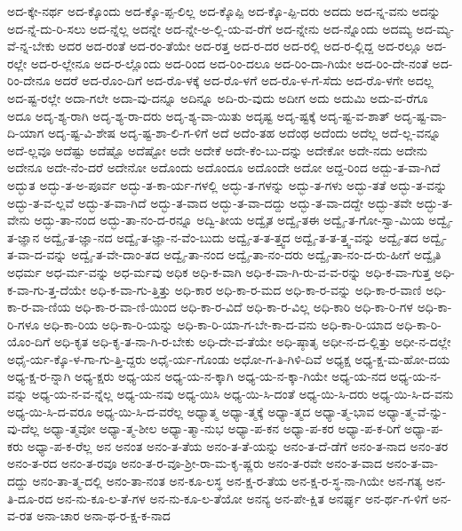 {ಅದ-ಕ್ಕೇ-ನರ್ಥ
ಅದ-ಕ್ಕೊಂದು
ಅದ-ಕ್ಕೊ-ಪ್ಪ-ಲಿಲ್ಲ
ಅದ-ಕ್ಕೊಪ್ಪಿ
ಅದ-ಕ್ಕೊ-ಪ್ಪಿ-ದರು
ಅದದು
ಅದ-ನ್ನ-ವನು
ಅದನ್ನು
ಅದ-ನ್ನೆ-ದು-ರಿ-ಸಲು
ಅದ-ನ್ನೆಲ್ಲ
ಅದನ್ನೇ
ಅದ-ನ್ನೇ-ಅ-ಲ್ಲಿ-ಯ-ವ-ರೆಗೆ
ಅದ-ನ್ನೇನು
ಅದ-ನ್ನೊಂದು
ಅದಮ್ಯ
ಅದ-ಮ್ಯ-ವೆ-ನ್ನ-ಬೇಕು
ಅದರ
ಅದ-ರಂತೆ
ಅದ-ರಂ-ತೆಯೇ
ಅದ-ರತ್ತ
ಅದ-ರ-ದರ
ಅದ-ರಲ್ಲಿ
ಅದ-ರ-ಲ್ಲಿದ್ದ
ಅದ-ರಲ್ಲೂ
ಅದ-ರಲ್ಲೇ
ಅದ-ರ-ಲ್ಲೇನೂ
ಅದ-ರ-ಲ್ಲೊಂದು
ಅದ-ರಿಂದ
ಅದ-ರಿಂ-ದಲೂ
ಅದ-ರಿಂ-ದಾ-ಗಿಯೇ
ಅದ-ರಿಂ-ದೇ-ನಂತೆ
ಅದ-ರಿಂ-ದೇನೂ
ಅದರೆ
ಅದ-ರೊಂ-ದಿಗೆ
ಅದ-ರೊ-ಳಕ್ಕೆ
ಅದ-ರೊ-ಳಗೆ
ಅದ-ರೊ-ಳ-ಗೆ-ಸೆದು
ಅದ-ರೊ-ಳಗೇ
ಅದಲ್ಲ
ಅದ-ಷ್ಟ-ರಲ್ಲೇ
ಅದಾ-ಗಲೇ
ಅದಾ-ವು-ದನ್ನೂ
ಅದಿನ್ನೂ
ಅದಿ-ರು-ವುದು
ಅದೀಗ
ಅದು
ಅದುಮಿ
ಅದು-ವ-ರೆಗೂ
ಅದೂ
ಅದೃ-ಶ್ಯ-ರಾಗಿ
ಅದೃ-ಶ್ಯ-ರಾ-ದರು
ಅದೃ-ಶ್ಯ-ವಾ-ಯಿತು
ಅದೃಷ್ಟ
ಅದೃ-ಷ್ಟಕ್ಕೆ
ಅದೃ-ಷ್ಟ-ವ-ಶಾತ್
ಅದೃ-ಷ್ಟ-ವಾ-ದಿ-ಯಾಗ
ಅದೃ-ಷ್ಟ-ವಿ-ಶೇಷ
ಅದೃ-ಷ್ಟ-ಶಾ-ಲಿ-ಗ-ಳಿಗೆ
ಅದೆ
ಅದೆಂ-ತಹ
ಅದೆಂಥ
ಅದೆಂದು
ಅದೆಲ್ಲ
ಅದೆ-ಲ್ಲ-ವನ್ನೂ
ಅದೆ-ಲ್ಲವೂ
ಅದೆಷ್ಟು
ಅದೆಷ್ಟೊ
ಅದೆಷ್ಟೋ
ಅದೇ
ಅದೇಕೆ
ಅದೇ-ಕೆಂ-ಬು-ದನ್ನು
ಅದೇಕೋ
ಅದೇ-ನದು
ಅದೇನು
ಅದೇನೂ
ಅದೇ-ನೆಂ-ದರೆ
ಅದೇನೋ
ಅದೊಂದು
ಅದೊಂದೂ
ಅದೊಂದೇ
ಅದೋ
ಅದ್ದ-ರಿಂದ
ಅದ್ಬು-ತ-ವಾ-ಗಿದೆ
ಅದ್ಭುತ
ಅದ್ಭು-ತ-ಅ-ಪೂರ್ವ
ಅದ್ಭು-ತ-ಕಾ-ರ್ಯ-ಗಳಲ್ಲಿ
ಅದ್ಭು-ತ-ಗಳನ್ನು
ಅದ್ಭು-ತ-ಗಳು
ಅದ್ಭು-ತತೆ
ಅದ್ಭು-ತ-ವನ್ನು
ಅದ್ಭು-ತ-ವ-ಲ್ಲವೆ
ಅದ್ಭು-ತ-ವಾ-ಗಿದೆ
ಅದ್ಭು-ತ-ವಾದ
ಅದ್ಭು-ತ-ವಾ-ದದ್ದು
ಅದ್ಭು-ತ-ವಾ-ದದ್ದೇ
ಅದ್ಭು-ತವೇ
ಅದ್ಭು-ತ-ವೇನು
ಅದ್ಭು-ತಾ-ನಂದ
ಅದ್ಭು-ತಾ-ನಂ-ದ-ರನ್ನೂ
ಅದ್ವಿ-ತೀಯ
ಅದ್ವೈತ
ಅದ್ವೈ-ತಈ
ಅದ್ವೈ-ತ-ಗೋ-ಸ್ವಾ-ಮಿಯ
ಅದ್ವೈ-ತ-ಜ್ಞಾನ
ಅದ್ವೈ-ತ-ಜ್ಞಾ-ನದ
ಅದ್ವೈ-ತ-ಜ್ಞಾ-ನ-ವೆಂ-ಬುದು
ಅದ್ವೈ-ತ-ತ-ತ್ತ್ವದ
ಅದ್ವೈ-ತ-ತ-ತ್ತ್ವ-ವನ್ನು
ಅದ್ವೈ-ತದ
ಅದ್ವೈ-ತ-ವಾ-ದ-ವನ್ನು
ಅದ್ವೈ-ತ-ವೇ-ದಾಂ-ತದ
ಅದ್ವೈ-ತಾ-ನಂದ
ಅದ್ವೈ-ತಾ-ನಂ-ದರು
ಅದ್ವೈ-ತಾ-ನಂ-ದ-ರು-ಹೀಗೆ
ಅದ್ವೈತಿ
ಅಧರ್ಮ
ಅಧ-ರ್ಮ-ವನ್ನು
ಅಧ-ರ್ಮವು
ಅಧಿಕ
ಅಧಿ-ಕ-ವಾಗಿ
ಅಧಿ-ಕ-ವಾ-ಗಿ-ರು-ವ-ವ-ರನ್ನು
ಅಧಿ-ಕ-ವಾ-ಗುತ್ತ
ಅಧಿ-ಕ-ವಾ-ಗು-ತ್ತ-ದೆಯೇ
ಅಧಿ-ಕ-ವಾ-ಗು-ತ್ತಿತ್ತು
ಅಧಿ-ಕಾರ
ಅಧಿ-ಕಾ-ರ-ಮದ
ಅಧಿ-ಕಾ-ರ-ವನ್ನು
ಅಧಿ-ಕಾ-ರ-ವಾಣಿ
ಅಧಿ-ಕಾ-ರ-ವಾ-ಣಿಯ
ಅಧಿ-ಕಾ-ರ-ವಾ-ಣಿ-ಯಿಂದ
ಅಧಿ-ಕಾ-ರ-ವಿದೆ
ಅಧಿ-ಕಾ-ರ-ವಿಲ್ಲ
ಅಧಿ-ಕಾರಿ
ಅಧಿ-ಕಾ-ರಿ-ಗಳ
ಅಧಿ-ಕಾ-ರಿ-ಗಳೂ
ಅಧಿ-ಕಾ-ರಿಯ
ಅಧಿ-ಕಾ-ರಿ-ಯನ್ನು
ಅಧಿ-ಕಾ-ರಿ-ಯಾ-ಗ-ಬೇ-ಕಾ-ದ-ವನು
ಅಧಿ-ಕಾ-ರಿ-ಯಾದ
ಅಧಿ-ಕಾ-ರಿ-ಯೊಂ-ದಿಗೆ
ಅಧಿ-ಕೃತ
ಅಧಿ-ಕೃ-ತ-ನಾ-ಗಿ-ರ-ಬೇಕು
ಅಧಿ-ದೇ-ವ-ತೆಯೇ
ಅಧಿ-ಷ್ಠಾತೃ
ಅಧೀ-ನ-ದ-ಲ್ಲಿತ್ತು
ಅಧೀ-ನ-ದಲ್ಲೇ
ಅಧೈ-ರ್ಯ-ಕ್ಕೊ-ಳ-ಗಾ-ಗು-ತ್ತಿ-ದ್ದರು
ಅಧೈ-ರ್ಯ-ಗೊಂಡು
ಅಧೋ-ಗ-ತಿ-ಗಿಳಿ-ದಿವೆ
ಅಧ್ಯಕ್ಷ
ಅಧ್ಯ-ಕ್ಷ-ಮ-ಹೋ-ದಯ
ಅಧ್ಯ-ಕ್ಷ-ರ-ನ್ನಾಗಿ
ಅಧ್ಯ-ಕ್ಷರು
ಅಧ್ಯ-ಯನ
ಅಧ್ಯ-ಯ-ನ-ಕ್ಕಾಗಿ
ಅಧ್ಯ-ಯ-ನ-ಕ್ಕಾ-ಗಿಯೇ
ಅಧ್ಯ-ಯ-ನದ
ಅಧ್ಯ-ಯ-ನ-ವನ್ನು
ಅಧ್ಯ-ಯ-ನ-ವ-ನ್ನೆಲ್ಲ
ಅಧ್ಯ-ಯ-ನವು
ಅಧ್ಯ-ಯಿಸಿ
ಅಧ್ಯ-ಯಿ-ಸಿ-ದಂತೆ
ಅಧ್ಯ-ಯಿ-ಸಿ-ದರು
ಅಧ್ಯ-ಯಿ-ಸಿ-ದ-ವನು
ಅಧ್ಯ-ಯಿ-ಸಿ-ದ-ವರೂ
ಅಧ್ಯ-ಯಿ-ಸಿ-ದ-ವರೆಲ್ಲ
ಅಧ್ಯಾತ್ಮ
ಅಧ್ಯಾ-ತ್ಮಕ್ಕೆ
ಅಧ್ಯಾ-ತ್ಮದ
ಅಧ್ಯಾ-ತ್ಮ-ಭಾವ
ಅಧ್ಯಾ-ತ್ಮ-ವೆ-ನ್ನು-ವು-ದೆಲ್ಲ
ಅಧ್ಯಾ-ತ್ಮವೋ
ಅಧ್ಯಾ-ತ್ಮ-ಶೀಲ
ಅಧ್ಯಾ-ತ್ಮಾ-ನುಭ
ಅಧ್ಯಾ-ಪ-ಕನ
ಅಧ್ಯಾ-ಪ-ಕರ
ಅಧ್ಯಾ-ಪ-ಕ-ರಿಗೆ
ಅಧ್ಯಾ-ಪ-ಕರು
ಅಧ್ಯಾ-ಪ-ಕ-ರೆಲ್ಲ
ಅನ
ಅನಂತ
ಅನಂ-ತ-ತೆಯ
ಅನಂ-ತ-ತೆ-ಯನ್ನು
ಅನಂ-ತ-ದೆ-ಡೆಗೆ
ಅನಂ-ತ-ನಾದ
ಅನಂ-ತರ
ಅನಂ-ತ-ರದ
ಅನಂ-ತ-ರವೂ
ಅನಂ-ತ-ರ-ವೂ-ಶ್ರೀ-ರಾ-ಮ-ಕೃ-ಷ್ಣರು
ಅನಂ-ತ-ರವೇ
ಅನಂ-ತ-ವಾದ
ಅನಂ-ತ-ವಾ-ದದ್ದು
ಅನಂ-ತಾ-ತ್ಮ-ದಲ್ಲಿ
ಅನಂ-ತಾ-ನಂತ
ಅನ-ಕೂ-ಲಸ್ಥ
ಅನ-ಕ್ಷ-ರ-ತೆಯ
ಅನ-ಕ್ಷ-ರ-ಸ್ಥ-ನಾ-ಗಿಯೇ
ಅನ-ಗತ್ಯ
ಅನ-ತಿ-ದೂ-ರದ
ಅನ-ನು-ಕೂ-ಲ-ತೆ-ಗಳ
ಅನ-ನು-ಕೂ-ಲ-ತೆಯೋ
ಅನನ್ಯ
ಅನ-ಪೇ-ಕ್ಷಿತ
ಅನರ್ಘ್ಯ
ಅನ-ರ್ಥ-ಗ-ಳಿಗೆ
ಅನ-ವ-ರತ
ಅನಾ-ಚಾರ
ಅನಾ-ಥ-ರ-ಕ್ಷ-ಕ-ನಾದ
}
